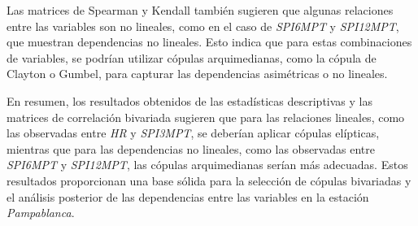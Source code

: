 Las matrices de Spearman y Kendall también sugieren que algunas relaciones entre las variables son no lineales, como en el caso de \textit{SPI6MPT} y \textit{SPI12MPT}, que muestran dependencias no lineales. Esto indica que para estas combinaciones de variables, se podrían utilizar cópulas arquimedianas, como la cópula de Clayton o Gumbel, para capturar las dependencias asimétricas o no lineales.

En resumen, los resultados obtenidos de las estadísticas descriptivas y las matrices de correlación bivariada sugieren que para las relaciones lineales, como las observadas entre \textit{HR} y \textit{SPI3MPT}, se deberían aplicar cópulas elípticas, mientras que para las dependencias no lineales, como las observadas entre \textit{SPI6MPT} y \textit{SPI12MPT}, las cópulas arquimedianas serían más adecuadas. Estos resultados proporcionan una base sólida para la selección de cópulas bivariadas y el análisis posterior de las dependencias entre las variables en la estación \textit{Pampablanca}.


